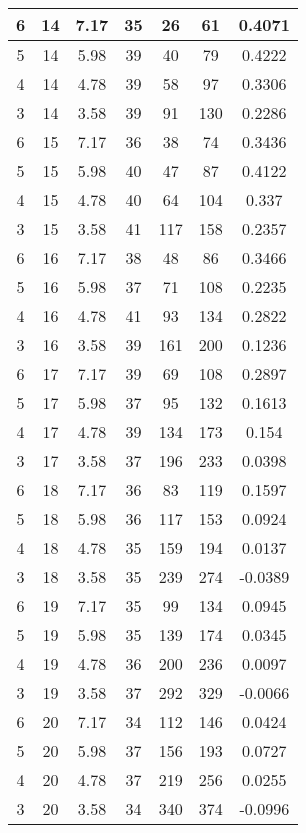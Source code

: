 \documentclass[letterpaper, 12pt]{article}
\begin{document}
\begin{longtable}{|c|c|c|c|c|c|c|}
\hline
6 & 14 & 7.17 & 35 & 26 & 61 & 0.4071 \\
\hline
5 & 14 & 5.98 & 39 & 40 & 79 & 0.4222 \\
\hline
4 & 14 & 4.78 & 39 & 58 & 97 & 0.3306 \\
\hline
3 & 14 & 3.58 & 39 & 91 & 130 & 0.2286 \\
\hline
6 & 15 & 7.17 & 36 & 38 & 74 & 0.3436 \\
\hline
5 & 15 & 5.98 & 40 & 47 & 87 & 0.4122 \\
\hline
4 & 15 & 4.78 & 40 & 64 & 104 & 0.337 \\
\hline
3 & 15 & 3.58 & 41 & 117 & 158 & 0.2357 \\
\hline
6 & 16 & 7.17 & 38 & 48 & 86 & 0.3466 \\
\hline
5 & 16 & 5.98 & 37 & 71 & 108 & 0.2235 \\
\hline
4 & 16 & 4.78 & 41 & 93 & 134 & 0.2822 \\
\hline
3 & 16 & 3.58 & 39 & 161 & 200 & 0.1236 \\
\hline
6 & 17 & 7.17 & 39 & 69 & 108 & 0.2897 \\
\hline
5 & 17 & 5.98 & 37 & 95 & 132 & 0.1613 \\
\hline
4 & 17 & 4.78 & 39 & 134 & 173 & 0.154 \\
\hline
3 & 17 & 3.58 & 37 & 196 & 233 & 0.0398 \\
\hline
6 & 18 & 7.17 & 36 & 83 & 119 & 0.1597 \\
\hline
5 & 18 & 5.98 & 36 & 117 & 153 & 0.0924 \\
\hline
4 & 18 & 4.78 & 35 & 159 & 194 & 0.0137 \\
\hline
3 & 18 & 3.58 & 35 & 239 & 274 & -0.0389 \\
\hline
6 & 19 & 7.17 & 35 & 99 & 134 & 0.0945 \\
\hline
5 & 19 & 5.98 & 35 & 139 & 174 & 0.0345 \\
\hline
4 & 19 & 4.78 & 36 & 200 & 236 & 0.0097 \\
\hline
3 & 19 & 3.58 & 37 & 292 & 329 & -0.0066 \\
\hline
6 & 20 & 7.17 & 34 & 112 & 146 & 0.0424 \\
\hline
5 & 20 & 5.98 & 37 & 156 & 193 & 0.0727 \\
\hline
4 & 20 & 4.78 & 37 & 219 & 256 & 0.0255 \\
\hline
3 & 20 & 3.58 & 34 & 340 & 374 & -0.0996 \\
\hline
\end{longtable}
\end{document}
